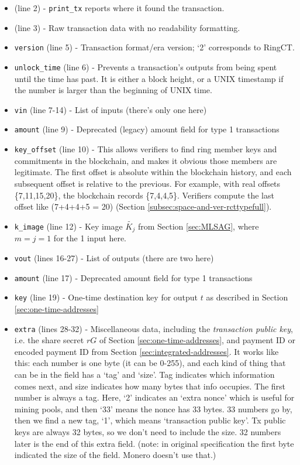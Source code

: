 \begin{appendices}
\begin{itemize}
    \item (line 2) - {\tt print\_tx} reports where it found the transaction.
    \item (line 3) - Raw transaction data with no readability formatting.
	\item {\tt version} (line 5) - Transaction format/era version; `2' corresponds to RingCT.
	\item {\tt unlock\_time} (line 6) - Prevents a transaction's outputs from being spent until the time has past. It is either a block height, or a UNIX timestamp if the number is larger than the beginning of UNIX time.	
	\item {\tt vin} (line 7-14) - List of inputs (there’s only one here)
	\item {\tt amount} (line 9) - Deprecated (legacy) amount field for type 1 transactions
	\item {\tt key\_offset} (line 10) - This allows verifiers to find ring member keys and commitments in the blockchain, and makes it obvious those members are legitimate. The first offset is absolute within the blockchain history, and each subsequent offset is relative to the previous. For example, with real offsets \{7,11,15,20\}, the blockchain records \{7,4,4,5\}. Verifiers compute the last offset like (7+4+4+5 = 20) (Section \ref{subsec:space-and-ver-rcttypefull}).
	\item {\tt k\_image} (line 12) - Key image \(\tilde{K_j}\) from Section \ref{sec:MLSAG}, where $m = j = 1$ for the 1 input here.
	\item {\tt vout} (lines 16-27) - List of outputs (there are two here)
	\item {\tt amount} (line 17) - Deprecated amount field for type 1 transactions
	\item {\tt key} (line 19) - One-time destination key for output $t$ as described in Section \ref{sec:one-time-addresses}
	\item {\tt extra} (lines 28-32) - Miscellaneous data, including the {\em transaction public key}, i.e. the share secret $r G$ of Section  \ref{sec:one-time-addresses}, and payment ID or encoded payment ID from Section \ref{sec:integrated-addresses}. It works like this: each number is one byte (it can be 0-255), and each kind of thing that can be in the field has a `tag' and `size'. Tag indicates which information comes next, and size indicates how many bytes that info occupies. The first number is always a tag. Here, `2' indicates an `extra nonce' which is useful for mining pools, and then `33' means the nonce has 33 bytes. 33 numbers go by, then we find a new tag, `1', which means `transaction public key'. Tx public keys are always 32 bytes, so we don't need to include the size. 32 numbers later is the end of this extra field. (note: in original specification the first byte indicated the size of the field. Monero doesn't use that.) \cite{tx-extra-field}

\end{itemize}
\end{appendices}

